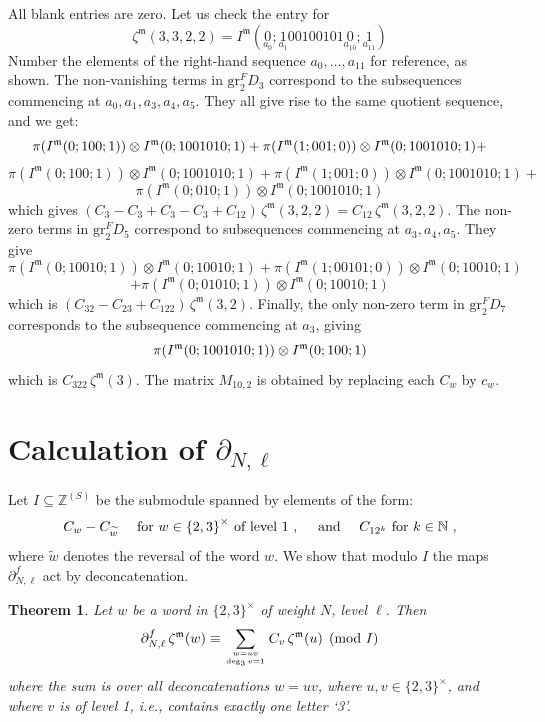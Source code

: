 \documentclass[10pt]{amsart}
\newtheorem{thm}{Theorem}[section]
\theoremstyle{definition}
\theoremstyle{remark}
\numberwithin{equation}{section}
\newcommand{\Z}{\mathbb Z}
\newcommand{\N}{\mathbb N}
\newcommand{\gr}{\mathrm{gr}}
\newcommand{\zetam}{\zeta^{ \mathfrak{m}}}
\newcommand{\Imot}{I^{\mathfrak{m}}}
\begin{document}
All blank entries are zero. Let us check the entry for 
$$\zetam(3,3,2,2)=\Imot(\underset{a_0}{0};\underset{a_1}{1}00100101\underset{a_{10}}{0};\underset{a_{11}}{1})$$
Number the elements of the right-hand sequence $a_0,\ldots, a_{11}$ for reference, as shown.
The non-vanishing terms in  $\gr^F_2 D_3$ correspond to the subsequences commencing at $a_0,a_1,a_3,a_4,a_5$. They all give rise to the same quotient sequence, and we get:
$$ {\small \pi(\Imot(0;100;1)) \otimes \Imot(0;1001010;1) + \pi(\Imot(1;001;0))\otimes \Imot(0;1001010;1)+} $$
$$\pi(\Imot(0;100;1)) \otimes \Imot(0;1001010;1) + \pi(\Imot(1;001;0))\otimes \Imot(0;1001010;1) + $$
$$\pi(\Imot(0;010;1)) \otimes \Imot(0;1001010;1)$$
which gives $(C_3-C_3 +C_3-C_3+C_{12})\, \zetam(3,2,2)=C_{12}\, \zetam(3,2,2)$.  The non-zero terms in $\gr^F_2 D_5$ correspond to subsequences commencing at 
$a_3,a_4,a_5$. 
They give
$$\pi(\Imot(0;10010;1)) \otimes \Imot(0;10010;1) + \pi(\Imot(1;00101;0))\otimes \Imot(0;10010;1) $$
$$+ \pi(\Imot(0;01010;1))\otimes \Imot(0;10010;1)$$
which is $(C_{32}-C_{23}+C_{122} ) \,\zetam(3,2)$. Finally, the only non-zero term  in $\gr^F_2 D_7$ corresponds to the subsequence commencing at 
$a_3$, giving
$$ \small{\pi(\Imot(0;1001010;1)) \otimes \Imot(0;100;1)} $$
 which is $C_{322}\,  \zetam(3)$. The matrix $M_{10,2}$ is obtained by replacing each $C_w$ by $c_w$.






\section{Calculation  of  $\partial_{N,\ell}$}
Let  $I \subseteq \Z^{(S)}$ be the submodule spanned by elements of the form:
\begin{equation}\label{Idef}
C_w-C_{\widetilde{w}} \quad  \hbox{ for }   w\in {\{2,3\} }^{\times} \hbox{ of level } 1 \ , \quad \hbox{ and } \quad  C_{12^k}   \hbox{ for }  k\in \N\ ,
\end{equation}
where $\widetilde{w}$ denotes the reversal of the word $w$.
 We show that   modulo $I$ the maps  $\partial^f_{N,\ell}$ 
act by deconcatenation.
\begin{thm}  \label{thmmodI} Let $w$ be a word in  $\{2,3\}^{\times}$ of weight $N$, level $\ell$.  Then 
$$\partial^f_{N,\ell} \,  \zetam(w) \equiv \sum_{w = uv \atop \deg_3 v=1} C_v \, \zetam(u) \pmod I $$ 
where the sum is over all deconcatenations $w=uv$, where $u,v\in \{2,3\}^{\times}$,  and where $v$ is of level 1, i.e., contains exactly one letter `3'.
\end{thm}
\end{document}
